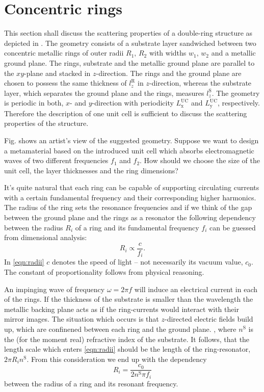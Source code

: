 \section{Concentric rings}
\label{sec:double_rings}
This section shall discuss the scattering properties of a double-ring structure as depicted in . 
The geometry consists of a substrate layer sandwiched between two concentric metallic rings of outer radii $R_{1},\,R_{2}$ with widths $w_1,\,w_2$ and a metallic ground plane. The rings, substrate and the metallic ground plane are parallel to the $xy$-plane and stacked in $z$-direction.
The rings and the ground plane are chosen to possess the same thickness of $l_z^{\mathrm{R}}$ in $z$-direction, whereas the substrate layer, which separates the ground plane and the rings, measures $l_z^{\mathrm{S}}$.
The geometry is periodic in both, $x$- and $y$-direction with periodicity $L_\mathrm{x}^\mathrm{UC}$ and $L_\mathrm{y}^\mathrm{UC}$, respectively. Therefore the description of one unit cell is sufficient to discuss the scattering properties of the structure.

Fig.  shows an artist's view of the suggested geometry. Suppose we want to design a metamaterial based on the introduced unit cell which absorbs electromagnetic waves of two different frequencies $f_1$ and $f_2$. How should we choose the size of the unit cell, the layer thicknesses and the ring dimensions? 

It's quite natural that each ring can be capable of supporting circulating currents with a certain fundamental frequency and their corresponding higher harmonics. The radius of the ring sets the resonance frequencies and if we think of the gap between the ground plane and the rings as a resonator the following dependency between the radius $R_i$ of a ring and its fundamental frequency $f_i$ can be guessed from dimensional analysis:
\begin{equation}
R_i \propto \frac{c}{f_i}.
\label{eqn:radii}
\end{equation}
In \cref{eqn:radii} $c$ denotes the speed of light -- not necessarily its vacuum value, $c_0$. The constant of proportionality follows from physical reasoning. 

An impinging wave of frequency $\omega = 2\pi f$ will induce an electrical current in each of the rings. If the thickness of the substrate is smaller than the wavelength the metallic backing plane acts as if the ring-currents would interact with their mirror images. The situation which occurs is that $z$-directed electric fields build up, which are confinened between each ring and the ground plane.
, where $n^\mathrm{S}$ is the (for the moment real) refractive index of the substrate. It follows, that the 
length scale which enters \cref{eqn:radii} should be the length of the ring-resonator, $2\pi R_i n^\mathrm{S}$. From this consideration we end up with the dependency
\begin{equation}
R_i = \frac{c_0}{2 n^\mathrm{S}\pi f_i}
\label{eqn:radii_precise}
\end{equation}
between the radius of a ring and its resonant frequency.

